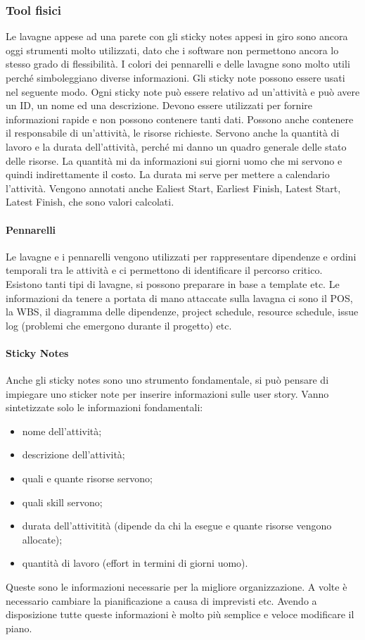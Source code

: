 \subsubsection{Tool fisici}
Le lavagne appese ad una parete con gli sticky notes appesi in giro sono ancora oggi strumenti molto utilizzati, dato che i software non permettono ancora lo stesso grado di flessibilità. I colori dei pennarelli e delle lavagne sono molto utili perché simboleggiano diverse informazioni. Gli sticky note possono essere usati nel seguente modo. Ogni sticky note può essere relativo ad un'attività e può avere un ID, un nome ed una descrizione. Devono essere utilizzati per fornire informazioni rapide e non possono contenere tanti dati. Possono anche contenere il responsabile di un'attività, le risorse richieste. Servono anche la quantità di lavoro e la durata dell'attività, perché mi danno un quadro generale delle stato delle risorse. La quantità mi da informazioni sui giorni uomo che mi servono e quindi indirettamente il costo. La durata mi serve per mettere a calendario l'attività. Vengono annotati anche Ealiest Start, Earliest Finish, Latest Start, Latest Finish, che sono valori calcolati.
\paragraph{Pennarelli}
Le lavagne e i pennarelli vengono utilizzati per rappresentare dipendenze e ordini temporali tra le attività e ci permettono di identificare il percorso critico.
\noindent Esistono tanti tipi di lavagne, si possono preparare in base a template etc.
Le informazioni da tenere a portata di mano attaccate sulla lavagna ci sono il POS, la WBS, il diagramma delle dipendenze, project schedule, resource schedule, issue log (problemi che emergono durante il progetto) etc.
\paragraph{Sticky Notes}
Anche gli sticky notes sono uno strumento fondamentale, si può pensare di impiegare uno sticker note per inserire informazioni sulle user story. Vanno sintetizzate solo le informazioni fondamentali:
\begin{itemize}
	\item nome dell'attività;
	\item descrizione dell'attività;
	\item quali e quante risorse servono;
	\item quali skill servono;
	\item durata dell'attivitità (dipende da chi la esegue e quante risorse vengono allocate);
	\item quantità di lavoro (effort in termini di giorni uomo).
\end{itemize}
\noindent Queste sono le informazioni necessarie per la migliore organizzazione. A volte è necessario cambiare la pianificazione a causa di imprevisti etc. Avendo a disposizione tutte queste informazioni è molto più semplice e veloce modificare il piano.
